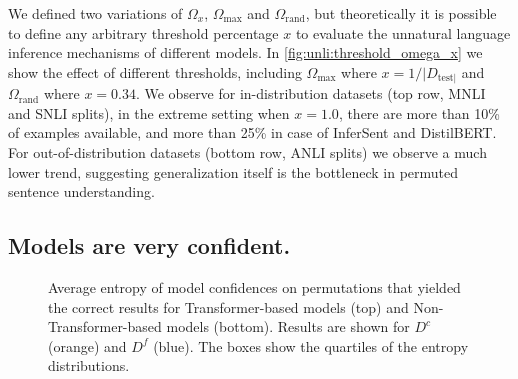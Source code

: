 \documentclass[letterpaper, 12pt]{report}
\begin{document}
We defined two variations of $\Omega_x$, $\Omega_{\text{max}}$ and $\Omega_{\text{rand}}$, but theoretically it is possible to define any arbitrary threshold percentage $x$ to evaluate the unnatural language inference mechanisms of different models. In \autoref{fig:unli:threshold_omega_x} we show the effect of different thresholds, including $\Omega_{\text{max}}$ where $x = 1/|D_{\text{test}|}$ and $\Omega_{\text{rand}}$ where $x = 0.34$. We observe for in-distribution datasets (top row, MNLI and SNLI splits), in the extreme setting when $x=1.0$, there are more than 10\% of examples available, and more than 25\% in case of InferSent and DistilBERT. For out-of-distribution datasets (bottom row, ANLI splits) we observe a much lower trend, suggesting generalization itself is the bottleneck in permuted sentence understanding.



\subsection{Models are very confident.}
\label{sec:unli_results_conf}

\begin{figure}[t]
    \centering
    \caption{Average entropy of model confidences on permutations that yielded the correct results for Transformer-based models (top) and Non-Transformer-based models (bottom). Results are shown for $D^c$ (orange) and $D^f$ (blue). The boxes show the quartiles of the entropy distributions.}
    \label{fig:unli_all_entropy}
\end{figure}
\end{document}
